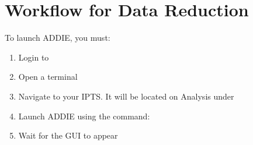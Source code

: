 \chapter{Workflow for Data Reduction}
To launch ADDIE, you must:
\begin{enumerate}
\item Login to \analysis
\item Open a terminal
\item Navigate to your IPTS. It will be located on Analysis under \iptsPrint
\item Launch ADDIE using the command: \addiecmd
\item Wait for the GUI to appear

\end{enumerate}






